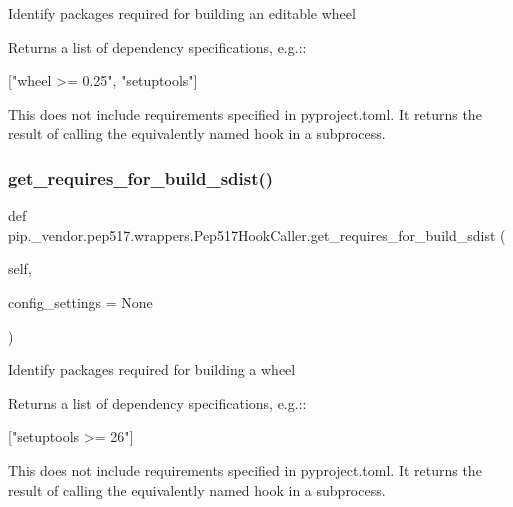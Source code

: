 \begin{DoxyVerb}Identify packages required for building an editable wheel

Returns a list of dependency specifications, e.g.::

    ["wheel >= 0.25", "setuptools"]

This does not include requirements specified in pyproject.toml.
It returns the result of calling the equivalently named hook in a
subprocess.
\end{DoxyVerb}
 \mbox{\label{classpip_1_1__vendor_1_1pep517_1_1wrappers_1_1Pep517HookCaller_a9743026ea00e63558911128cf6720fa0}} 
\subsubsection{\texorpdfstring{get\+\_\+requires\+\_\+for\+\_\+build\+\_\+sdist()}{get\_requires\_for\_build\_sdist()}}
{\footnotesize\ttfamily def pip.\+\_\+vendor.\+pep517.\+wrappers.\+Pep517\+Hook\+Caller.\+get\+\_\+requires\+\_\+for\+\_\+build\+\_\+sdist (\begin{DoxyParamCaption}\item[{}]{self,  }\item[{}]{config\+\_\+settings = {\ttfamily None} }\end{DoxyParamCaption})}

\begin{DoxyVerb}Identify packages required for building a wheel

Returns a list of dependency specifications, e.g.::

    ["setuptools >= 26"]

This does not include requirements specified in pyproject.toml.
It returns the result of calling the equivalently named hook in a
subprocess.
\end{DoxyVerb}
 \mbox{\label{classpip_1_1__vendor_1_1pep517_1_1wrappers_1_1Pep517HookCaller_a2024c5e308c0cf759131429d9fab77ee}} 
